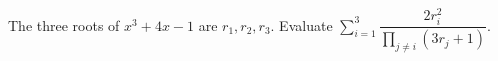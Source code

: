 The three roots of $x^3+4x-1$ are $r_1,r_2,r_3$. Evaluate $\displaystyle\sum_{i=1}^3\dfrac{2r_i^2}{\prod_{j\ne i}(3r_j+1)}$.
